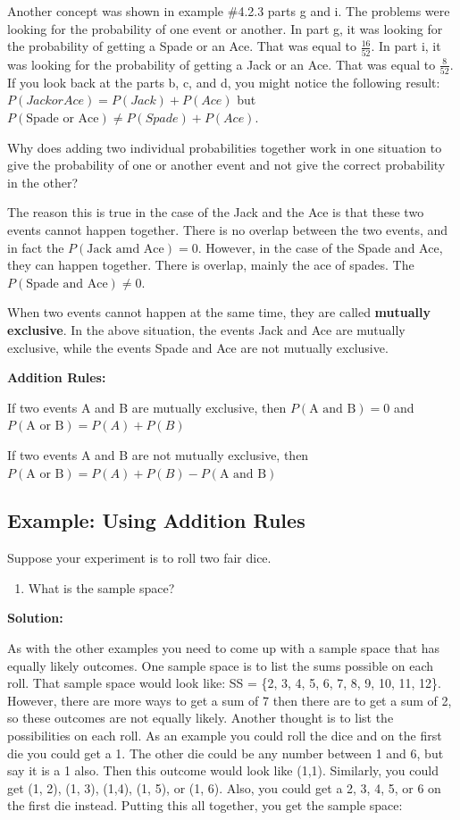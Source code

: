 \documentclass[]{book}
\providecommand{\tightlist}{%
  \setlength{\itemsep}{0pt}\setlength{\parskip}{0pt}}
\begin{document}
Another concept was shown in example \#4.2.3 parts g and i. The problems were looking for the probability of one event or another. In part g, it was looking for the probability of getting a Spade or an Ace. That was equal to \(\frac{16}{52}\). In part i, it was looking for the probability of getting a Jack or an Ace. That was equal to \(\frac{8}{52}\). If you look back at the parts b, c, and d, you might notice the following result: \(P(Jack or Ace)=P(Jack)+P(Ace)\) but \(P(\text{Spade or Ace})\ne P(Spade)+P(Ace)\).

Why does adding two individual probabilities together work in one situation to give the probability of one or another event and not give the correct probability in the other?

The reason this is true in the case of the Jack and the Ace is that these two events cannot happen together. There is no overlap between the two events, and in fact the \(P(\text{Jack amd Ace})=0\). However, in the case of the Spade and Ace, they can happen together. There is overlap, mainly the ace of spades. The \(P(\text{Spade and Ace})\ne0\).

When two events cannot happen at the same time, they are called \textbf{mutually exclusive}. In the above situation, the events Jack and Ace are mutually exclusive, while the events Spade and Ace are not mutually exclusive.

\textbf{Addition Rules:}

If two events A and B are mutually exclusive, then \(P(\text{A and B})=0\) and \(P(\text{A or B})=P(A)+P(B)\)

If two events A and B are not mutually exclusive, then \(P(\text{A or B})=P(A)+P(B)-P(\text{A and B})\)

\hypertarget{example-using-addition-rules}{%
\subsection{Example: Using Addition Rules}\label{example-using-addition-rules}}

Suppose your experiment is to roll two fair dice.

\begin{enumerate}
\def\labelenumi{\alph{enumi}.}
\tightlist
\item
  What is the sample space?
\end{enumerate}

\textbf{Solution:}

As with the other examples you need to come up with a sample space that has equally likely outcomes. One sample space is to list the sums possible on each roll. That sample space would look like: SS = \{2, 3, 4, 5, 6, 7, 8, 9, 10, 11, 12\}. However, there are more ways to get a sum of 7 then there are to get a sum of 2, so these outcomes are not equally likely. Another thought is to list the possibilities on each roll. As an example you could roll the dice and on the first die you could get a 1. The other die could be any number between 1 and 6, but say it is a 1 also. Then this outcome would look like (1,1). Similarly, you could get (1, 2), (1, 3), (1,4), (1, 5), or (1, 6). Also, you could get a 2, 3, 4, 5, or 6 on the first die instead. Putting this all together, you get the sample space:
\end{document}
